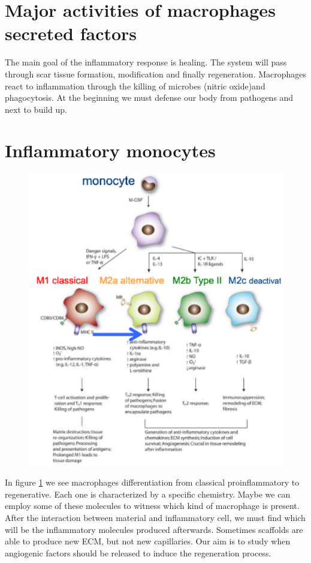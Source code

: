 \section{Major activities of macrophages secreted factors}
The main goal of the inflammatory response is healing. 
The system will pass through scar tissue formation, modification and finally regeneration. Macrophages react to inflammation through the killing of microbes (nitric oxide)and phagocytosis. 
At the beginning we must defense our body from pathogens and next to build up.

\section{Inflammatory monocytes}
\begin{figure}[h]
\includegraphics[width=1\textwidth]{mono_diff}
\caption{\label{fig:mono}}
\end{figure}
In figure \ref{fig:mono} we see macrophages differentiation from classical proinflammatory to regenerative. 
Each one is characterized by a specific chemistry. 
Maybe we can employ some of these molecules to witness which kind of macrophage is present. After the interaction between material and inflammatory cell, we must find which will be the inflammatory molecules produced afterwards. 
Sometimes scaffolds are able to produce new ECM, but not new capillaries. 
Our aim is to study when angiogenic factors should be released to induce the regeneration process. 
 
